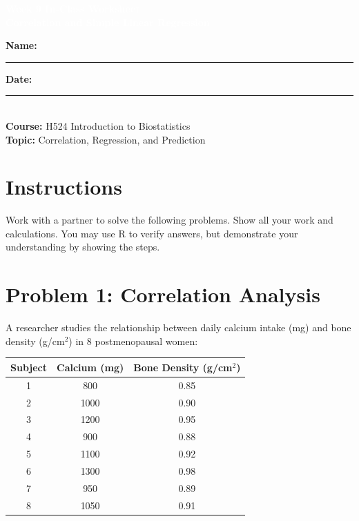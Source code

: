 \documentclass[11pt]{article}
\title{}
\author{}
\date{}
\begin{document}
\begin{tcolorbox}[colback=osaorange,colframe=black,boxrule=2pt,arc=0pt,left=6pt,right=6pt,top=10pt,bottom=10pt]
\centering
\textcolor{white}{\textbf{\Large Week 9 In-Class Worksheet}}\\
\textcolor{white}{\textbf{\large Correlation and Simple Linear Regression}}
\end{tcolorbox}

\vspace{8pt}

\noindent\textbf{Name:} \rule{8cm}{0.4pt} \hfill \textbf{Date:} \rule{4cm}{0.4pt}\\[0.5ex]
\textbf{Course:} H524 Introduction to Biostatistics\\
\textbf{Topic:} Correlation, Regression, and Prediction

\vspace{8pt}

\section*{Instructions}
Work with a partner to solve the following problems. Show all your work and calculations. You may use R to verify answers, but demonstrate your understanding by showing the steps.

\vspace{12pt}

\section{Problem 1: Correlation Analysis}

A researcher studies the relationship between daily calcium intake (mg) and bone density (g/cm$^2$) in 8 postmenopausal women:

\vspace{0.3cm}

\begin{center}
\begin{tabular}{ccc}
\toprule
Subject & Calcium (mg) & Bone Density (g/cm$^2$) \\
\midrule
1 & 800 & 0.85 \\
2 & 1000 & 0.90 \\
3 & 1200 & 0.95 \\
4 & 900 & 0.88 \\
5 & 1100 & 0.92 \\
6 & 1300 & 0.98 \\
7 & 950 & 0.89 \\
8 & 1050 & 0.91 \\
\bottomrule
\end{tabular}
\end{center}
\end{document}
